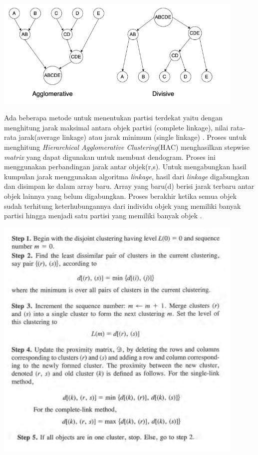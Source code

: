 \begin{enumerate}[leftmargin=1.3cm]
	\begin{center}
		\includegraphics[width=12cm]{img/bab_2/agVSDiv.png}
		\label{fig:asd}
	\end{center}

	Ada beberapa metode untuk menentukan partisi terdekat yaitu dengan menghitung jarak maksimal antara objek partisi (complete linkage), nilai rata-rata jarak(average linkage) atau jarak minimum (single linkage) \cite{3D3}. Proses untuk menghitung \textit{Hierarchical Agglomerative Clustering}(HAC) menghasilkan stepwise \textit{matrix} yang dapat digunakan untuk membuat dendogram. Proses ini menggunakan perbandingan jarak antar objek(r,s). Untuk mengabungkan hasil kumpulan jarak menggunakan algoritma \textit{linkage}, hasil dari \textit{linkage} digabungkan dan disimpan ke dalam array baru. Array yang baru(d) berisi jarak terbaru antar objek lainnya yang belum digabungkan. Proses berakhir ketika semua objek sudah terhitung keterhubungannya dari individu objek yang memiliki banyak partisi hingga menjadi satu partisi yang memiliki banyak objek \cite{2C9}.
	
	\begin{center}
		\includegraphics[width=12cm]{img/bab_2/algo_hac.png}
		\label{fig:algo_hac}
	\end{center}


\end{enumerate}
